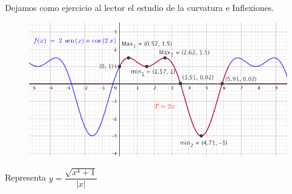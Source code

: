 \begin{proofw}
Dejamos como ejercicio al lector el estudio de la curvatura e Inflexiones.

	\begin{figure}[H]
		\centering
		\includegraphics[width=.8\textwidth]{imagenes/imagenes05/T05IM39.png}
	\end{figure}
	
\end{proofw}

\begin{ejre} Representa $y=\dfrac {\sqrt{x^4+1}}{|x|}$
	
\end{ejre}

